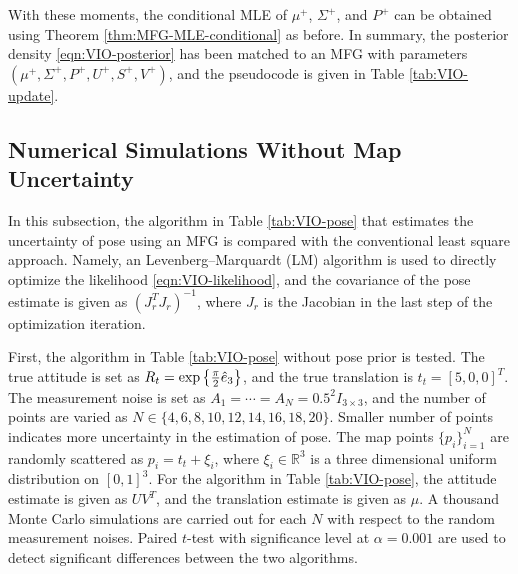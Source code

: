 With these moments, the conditional MLE of $\mu^+$, $\Sigma^+$, and $P^+$ can be obtained using Theorem \ref{thm:MFG-MLE-conditional} as before.
In summary, the posterior density \eqref{eqn:VIO-posterior} has been matched to an MFG with parameters $(\mu^+,\Sigma^+,P^+,U^+,S^+,V^+)$, and the pseudocode is given in Table \ref{tab:VIO-update}.

\subsection{Numerical Simulations Without Map Uncertainty} \label{section:VIO-simulation}

In this subsection, the algorithm in Table \ref{tab:VIO-pose} that estimates the uncertainty of pose using an MFG is compared with the conventional least square approach.
Namely, an Levenberg–Marquardt (LM) algorithm is used to directly optimize the likelihood \eqref{eqn:VIO-likelihood}, and the covariance of the pose estimate is given as $(J_r^TJ_r)^{-1}$, where $J_r$ is the Jacobian in the last step of the optimization iteration.

First, the algorithm in Table \ref{tab:VIO-pose} without pose prior is tested.
The true attitude is set as $R_t = \exp\left\{ \tfrac{\pi}{2}\hat{e}_3 \right\}$, and the true translation is $t_t = [5,0,0]^T$.
The measurement noise is set as $A_1 = \cdots = A_N = 0.5^2I_{3\times 3}$, and the number of points are varied as $N\in\{4,6,8,10,12,14,16,18,20\}$.
Smaller number of points indicates more uncertainty in the estimation of pose.
The map points $\{p_i\}_{i=1}^N$ are randomly scattered as $p_i = t_t + \xi_i$, where $\xi_i\in\mathbb{R}^3$ is a three dimensional uniform distribution on $[0,1]^3$.
For the algorithm in Table \ref{tab:VIO-pose}, the attitude estimate is given as $UV^T$, and the translation estimate is given as $\mu$.
A thousand Monte Carlo simulations are carried out for each $N$ with respect to the random measurement noises.
Paired $t$-test with significance level at $\alpha = 0.001$ are used to detect significant differences between the two algorithms.

